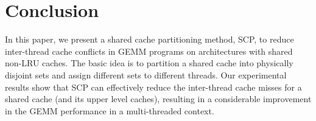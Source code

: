 \section{Conclusion}\label{sec:conclusion}
In this paper, we present a shared cache partitioning method,
SCP, to reduce inter-thread cache conflicts in GEMM programs
on architectures with shared non-LRU caches.
The basic idea is to partition a shared cache into physically
disjoint sets and assign different sets to different threads.
Our experimental results show that SCP can effectively reduce the inter-thread
cache misses for a shared cache (and its upper level caches),
resulting in a considerable improvement in the GEMM performance
in a multi-threaded context.


